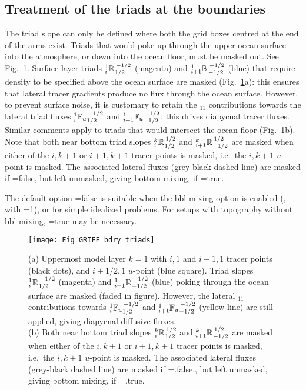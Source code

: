 \documentclass[NEMO_book]{subfiles}
\begin{document}
\subsection{Treatment of the triads at the boundaries}\label{sec:triad:iso_bdry}
The triad slope can only be defined where both the grid boxes centred at
the end of the arms exist. Triads that would poke up
through the upper ocean surface into the atmosphere, or down into the
ocean floor, must be masked out. See Fig.~\ref{fig:triad:bdry_triads}. Surface layer triads
$\triad{i}{1}{R}{1/2}{-1/2}$ (magenta) and
$\triad{i+1}{1}{R}{-1/2}{-1/2}$ (blue) that require density to be
specified above the ocean surface are masked (Fig.~\ref{fig:triad:bdry_triads}a): this ensures that lateral
tracer gradients produce no flux through the ocean surface. However,
to prevent surface noise, it is customary to retain the $_{11}$ contributions towards
the lateral triad fluxes $\triad[u]{i}{1}{F}{1/2}{-1/2}$ and
$\triad[u]{i+1}{1}{F}{-1/2}{-1/2}$; this drives diapycnal tracer
fluxes. Similar comments apply to triads that would intersect the
ocean floor (Fig.~\ref{fig:triad:bdry_triads}b). Note that both near bottom
triad slopes $\triad{i}{k}{R}{1/2}{1/2}$ and
$\triad{i+1}{k}{R}{-1/2}{1/2}$ are masked when either of the $i,k+1$
or $i+1,k+1$ tracer points is masked, i.e.\ the $i,k+1$ $u$-point is
masked. The associated lateral fluxes (grey-black dashed line) are
masked if =false, but left unmasked,
giving bottom mixing, if =true.

The default option =false is suitable when the
bbl mixing option is enabled (, with =1),
or  for simple idealized  problems. For setups with topography without
bbl mixing, =true may be necessary.
\begin{figure}[h] \begin{center}
    \texttt{[image: Fig\_GRIFF\_bdry\_triads]}
    \caption{  \label{fig:triad:bdry_triads}
      (a) Uppermost model layer $k=1$ with $i,1$ and $i+1,1$ tracer
      points (black dots), and $i+1/2,1$ $u$-point (blue square). Triad
      slopes $\triad{i}{1}{R}{1/2}{-1/2}$ (magenta) and $\triad{i+1}{1}{R}{-1/2}{-1/2}$
      (blue) poking through the ocean surface are masked (faded in
      figure). However, the lateral $_{11}$ contributions towards
      $\triad[u]{i}{1}{F}{1/2}{-1/2}$ and $\triad[u]{i+1}{1}{F}{-1/2}{-1/2}$
      (yellow line) are still applied, giving diapycnal diffusive
      fluxes.\\
      (b) Both near bottom triad slopes $\triad{i}{k}{R}{1/2}{1/2}$ and
      $\triad{i+1}{k}{R}{-1/2}{1/2}$ are masked when either of the $i,k+1$
      or $i+1,k+1$ tracer points is masked, i.e.\ the $i,k+1$ $u$-point
      is masked. The associated lateral fluxes (grey-black dashed
      line) are masked if =.false., but left
      unmasked, giving bottom mixing, if =.true.}
 \end{center} \end{figure}
\end{document}
